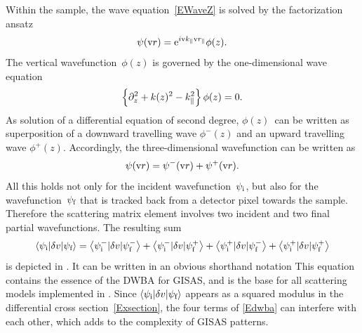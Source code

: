Within the sample, the wave equation~\cref{EWaveZ}
is solved by the factorization ansatz
\begin{equation}\label{Ekpar}
\psi(\r) = \e^{i \k_\plll\r_\plll} \phi(z).
\end{equation}
%
The vertical wavefunction~$\phi(z)$
is governed by the one-dimensional wave equation
\begin{equation}\label{Ewavez}
\left\{\partial_z^2 + k(z)^2 - k_\plll^2 \right\} \phi(z) = 0.
\end{equation}
As solution of a differential equation of second degree,
$\phi(z)$~can be written as superposition
of a downward travelling wave $\phi^-(z)$
and an upward travelling wave $\phi^+(z)$.
Accordingly, the three-dimensional wavefunction can be written as
\begin{equation}\label{Epsisumpm}
  \psi(\r) = \psi^-(\r)+\psi^+(\r).
\end{equation}
%
%
All this holds not only for the incident wavefunction~$\psi_\si$,
but also for the wavefunction~$\psi_\sf$
that is tracked back from a detector pixel towards the sample.
%
%
%
Therefore the scattering matrix element
involves two incident and two final partial wavefunctions.
The resulting sum
\begin{equation}\label{Edwba4}
  \bra \psi_\si|\delta v|\psi_\sf\ket
  = \bra \psi^-_\si|\delta v|\psi^-_\sf\ket
  + \bra \psi^-_\si|\delta v|\psi^+_\sf\ket
  + \bra \psi^+_\si|\delta v|\psi^-_\sf\ket
  + \bra \psi^+_\si|\delta v|\psi^+_\sf\ket
\end{equation}
is depicted in .
It can be written in an obvious shorthand notation
This equation contains the essence of
the DWBA for GISAS,
and is the base for all scattering models implemented in \BornAgain.
Since $\bra \psi_\si|\delta v|\psi_\sf\ket$
appears as a squared modulus
in the differential cross section~\cref{Exsection},
the four terms of \cref{Edwba} can interfere with each other,
which adds to the complexity of GISAS patterns.

